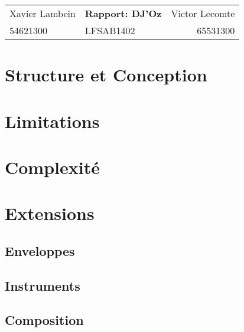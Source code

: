 \documentclass[a4paper,12pt]{article}
\begin{document}
\begin{center}
\begin{tabu} to \textwidth {lX[c]r}
    Xavier Lambein & \large{\textbf{Rapport: DJ'Oz}} & Victor Lecomte \\
    54621300 & LFSAB1402 & 65531300 \\
    \hline
\end{tabu}
\end{center}

\section{Structure et Conception}
\section{Limitations}
\section{Complexité}
\section{Extensions}
\subsection{Enveloppes}
\subsection{Instruments}
\subsection{Composition}
\end{document}
